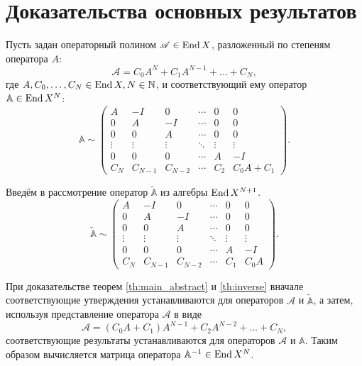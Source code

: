 \section{Доказательства основных результатов}
Пусть задан операторный полином $ \mathcal A \in \operatorname{End} X$, разложенный по степеням оператора $A$:
\[  \mathcal A = C_0 A^N + C_1 A^{N - 1} + \dotsc + C_N, \]
где $A, C_0, \dotsc, C_N \in \operatorname{End} X, N \in \mathbb{N}$, и соответствующий ему оператор $\mathbb A \in \operatorname{End}{X^N}$:
\[ \mathbb A \sim \begin{pmatrix}
    A & -I & 0  & \cdots & 0 & 0 \\
    0 & A  & -I & \cdots & 0 & 0 \\
    0 & 0  & A & \cdots & 0 & 0 \\
    \vdots & \vdots & \vdots & \ddots & \vdots & \vdots \\
    0 & 0 & 0 & \cdots & A & -I \\
    C_N & C_{N-1} & C_{N-2} & \cdots & C_2 & C_0 A + C_1
   \end{pmatrix}. \]

Введём в рассмотрение оператор $\widetilde{\mathbb A}$ из алгебры $\operatorname{End}{X^{N+1}}$.
\[ \widetilde{\mathbb A} \sim \begin{pmatrix}
    A & -I & 0  & \cdots & 0 & 0 \\
    0 & A  & -I & \cdots & 0 & 0 \\
    0 & 0  & A & \cdots & 0 & 0 \\
    \vdots & \vdots & \vdots & \ddots & \vdots & \vdots \\
    0 & 0 & 0 & \cdots & A & -I \\
    C_N & C_{N-1} & C_{N-2} & \cdots & C_1 & C_0 A
   \end{pmatrix}. \]

При доказательстве теорем \ref{th:main_abstract} и \ref{th:inverse} вначале соответствующие утверждения устанавливаются для операторов $\mathcal A$ и $\widetilde{\mathbb A}$, а затем, используя представление оператора $\mathcal A$ в виде
\[\mathcal A = (C_0 A + C_1) A^{N-1} + C_2 A^{N-2} + \dotsc + C_N, \]
соответствующие результаты устанавливаются для операторов $\mathcal A$ и $\mathbb A$. Таким образом вычисляется матрица оператора $\mathbb A^{-1} \in \operatorname{End}{X^N}$.

